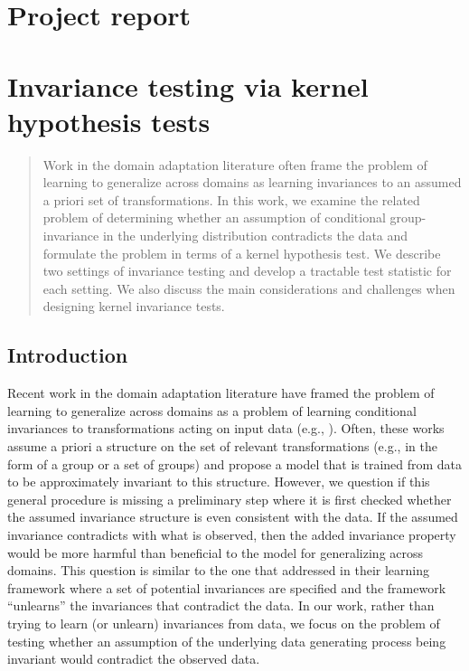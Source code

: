 

\section{Project report}
\vspace{1em}

\section*{Invariance testing via kernel hypothesis tests}
\vspace{1em}

\begin{abstract}
Work in the domain adaptation literature often frame the problem of learning to generalize across domains as learning invariances to an assumed a priori set of transformations. In this work, we examine the related problem of determining whether an assumption of conditional group-invariance in the underlying distribution contradicts the data and formulate the problem in terms of a kernel hypothesis test. We describe two settings of invariance testing and develop a tractable test statistic for each setting. We also discuss the main considerations and challenges when designing kernel invariance tests.
\end{abstract}


\subsection{Introduction}

Recent work in the domain adaptation literature have framed the problem of learning to generalize across domains as a problem of learning conditional invariances to transformations acting on input data (e.g., \parencite{Gu:2019,Chen:2020:scm,Schwobel:2021}). Often, these works assume a priori a structure on the set of relevant transformations (e.g., in the form of a group or a set of groups) and propose a model that is trained from data to be approximately invariant to this structure. However, we question if this general procedure is missing a preliminary step where it is first checked whether the assumed invariance structure is even consistent with the data. If the assumed invariance contradicts with what is observed, then the added invariance property would be more harmful than beneficial to the model for generalizing across domains. This question is similar to the one that \textcite{Mouli:2021} addressed in their learning framework where a set of potential invariances are specified and the framework ``unlearns'' the invariances that contradict the data. In our work, rather than trying to learn (or unlearn) invariances from data, we focus on the problem of testing whether an assumption of the underlying data generating process being invariant would contradict the observed data.
\\

